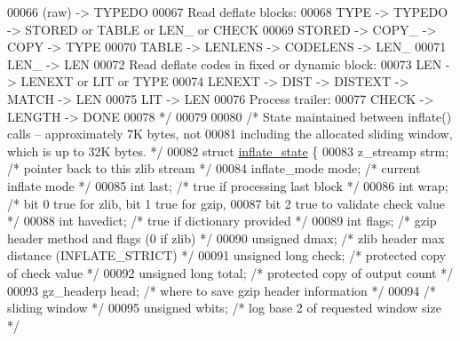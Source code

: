 \begin{DoxyCode}
00066 \textcolor{comment}{        (raw) -> TYPEDO}
00067 \textcolor{comment}{    Read deflate blocks:}
00068 \textcolor{comment}{            TYPE -> TYPEDO -> STORED or TABLE or LEN\_ or CHECK}
00069 \textcolor{comment}{            STORED -> COPY\_ -> COPY -> TYPE}
00070 \textcolor{comment}{            TABLE -> LENLENS -> CODELENS -> LEN\_}
00071 \textcolor{comment}{            LEN\_ -> LEN}
00072 \textcolor{comment}{    Read deflate codes in fixed or dynamic block:}
00073 \textcolor{comment}{                LEN -> LENEXT or LIT or TYPE}
00074 \textcolor{comment}{                LENEXT -> DIST -> DISTEXT -> MATCH -> LEN}
00075 \textcolor{comment}{                LIT -> LEN}
00076 \textcolor{comment}{    Process trailer:}
00077 \textcolor{comment}{        CHECK -> LENGTH -> DONE}
00078 \textcolor{comment}{ */}
00079 
00080 \textcolor{comment}{/* State maintained between inflate() calls -- approximately 7K bytes, not}
00081 \textcolor{comment}{   including the allocated sliding window, which is up to 32K bytes. */}
00082 \textcolor{keyword}{struct }\hyperlink{structinflate__state}{inflate\_state} \{
00083     z\_streamp strm;             \textcolor{comment}{/* pointer back to this zlib stream */}
00084     inflate\_mode mode;          \textcolor{comment}{/* current inflate mode */}
00085     \textcolor{keywordtype}{int} last;                   \textcolor{comment}{/* true if processing last block */}
00086     \textcolor{keywordtype}{int} wrap;                   \textcolor{comment}{/* bit 0 true for zlib, bit 1 true for gzip,}
00087 \textcolor{comment}{                                   bit 2 true to validate check value */}
00088     \textcolor{keywordtype}{int} havedict;               \textcolor{comment}{/* true if dictionary provided */}
00089     \textcolor{keywordtype}{int} flags;                  \textcolor{comment}{/* gzip header method and flags (0 if zlib) */}
00090     \textcolor{keywordtype}{unsigned} dmax;              \textcolor{comment}{/* zlib header max distance (INFLATE\_STRICT) */}
00091     \textcolor{keywordtype}{unsigned} \textcolor{keywordtype}{long} check;        \textcolor{comment}{/* protected copy of check value */}
00092     \textcolor{keywordtype}{unsigned} \textcolor{keywordtype}{long} total;        \textcolor{comment}{/* protected copy of output count */}
00093     gz\_headerp head;            \textcolor{comment}{/* where to save gzip header information */}
00094         \textcolor{comment}{/* sliding window */}
00095     \textcolor{keywordtype}{unsigned} wbits;             \textcolor{comment}{/* log base 2 of requested window size */}

\end{DoxyCode}
